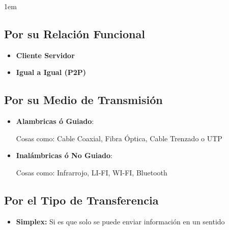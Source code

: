 \documentclass[12pt, fleqn]{report}                             %
\newenvironment{SmallIndentation}[1][0.75em]                    %
        {\begin{adjustwidth}{#1}{}\begin{footnotesize}}             %
        {\end{footnotesize}\end{adjustwidth}}                       %
\theoremstyle{break}                                            %
\begin{document}
\begin{SmallIndentation}[1em]
\begin{itemize}
                \end{itemize}


            \subsection{Por su Relación Funcional}

                \begin{itemize}
                    \item \textbf{Cliente Servidor}
                    \item \textbf{Igual a Igual (P2P)}
                \end{itemize}


            \subsection{Por su Medio de Transmisión}

                \begin{itemize}
                    \item \textbf{Alambricas ó Guiado}: 

                        Cosas como: Cable Coaxial, Fibra Óptica, Cable Trenzado o UTP 
                    
                    \item \textbf{Inalámbricas ó  No Guiado}:

                        Cosas como: Infrarrojo, LI-FI, WI-FI, Bluetooth
                \end{itemize}

            \subsection{Por el Tipo de Transferencia}

                \begin{itemize}
                    \item \textbf{Simplex:} 
                        Si es que solo se puede enviar información en un sentido 


\end{itemize}
\end{SmallIndentation}
\end{document}
